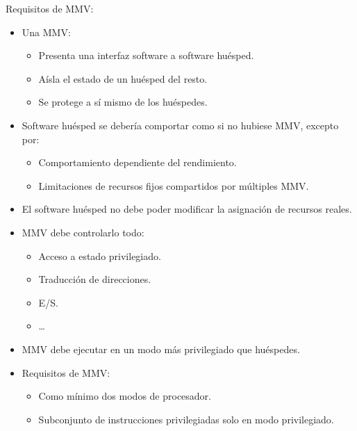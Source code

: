 \documentclass[12pt, twoside, openright]{report} %
\begin{document}
    Requisitos de MMV:

    \begin{itemize}
    
    \item
      Una MMV:

      \begin{itemize}
      
      \item
        Presenta una interfaz software a software huésped.
      \item
        Aísla el estado de un huésped del resto.
      \item
        Se protege a sí mismo de los huéspedes.
      \end{itemize}
    \item
      Software huésped se debería comportar como si no hubiese MMV,
      excepto por:

      \begin{itemize}
      
      \item
        Comportamiento dependiente del rendimiento.
      \item
        Limitaciones de recursos fijos compartidos por múltiples MMV.
      \end{itemize}
    \item
      El software huésped no debe poder modificar la asignación de
      recursos reales.
    \item
      MMV debe controlarlo todo:

      \begin{itemize}
      
      \item
        Acceso a estado privilegiado.
      \item
        Traducción de direcciones.
      \item
        E/S.

      \item
        \ldots{}
      \end{itemize}
    \item
      MMV debe ejecutar en un modo más privilegiado que huéspedes.
    \item
      Requisitos de MMV:

      \begin{itemize}
      
      \item
        Como mínimo dos modos de procesador.
      \item
        Subconjunto de instrucciones privilegiadas solo en modo
        privilegiado.
      \end{itemize}
    \end{itemize}
\end{document}
